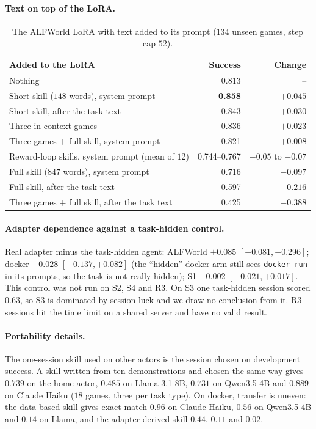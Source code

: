 \documentclass[11pt]{article}
\newcommand{\best}[1]{\textbf{#1}}
\begin{document}
\paragraph{Text on top of the LoRA.}
\begin{table}[h]
\centering
\caption{The ALFWorld LoRA with text added to its prompt ($134$ unseen games, step cap $52$).}
\label{tab:axlora}
\small
\begin{tabular}{lrr}
\toprule
Added to the LoRA & Success & Change\\
\midrule
Nothing & 0.813 & --\\
Short skill ($148$ words), system prompt & \best{0.858} & $+0.045$\\
Short skill, after the task text & 0.843 & $+0.030$\\
Three in-context games & 0.836 & $+0.023$\\
Three games $+$ full skill, system prompt & 0.821 & $+0.008$\\
Reward-loop skills, system prompt (mean of $12$) & 0.744--0.767 & $-0.05$ to $-0.07$\\
Full skill ($847$ words), system prompt & 0.716 & $-0.097$\\
Full skill, after the task text & 0.597 & $-0.216$\\
Three games $+$ full skill, after the task text & 0.425 & $-0.388$\\
\bottomrule
\end{tabular}
\end{table}

\paragraph{Adapter dependence against a task-hidden control.} Real adapter minus the task-hidden agent: ALFWorld $+0.085$ $[-0.081,+0.296]$; docker
$-0.028$ $[-0.137,+0.082]$ (the ``hidden'' docker arm still sees \texttt{docker run} in its prompts, so the task is not really hidden); S1 $-0.002$
$[-0.021,+0.017]$. This control was not run on S2, S4 and R3. On S3 one task-hidden session scored $0.63$, so S3 is dominated by session luck and we
draw no conclusion from it. R3 sessions hit the time limit on a shared server and have no valid result.

\paragraph{Portability details.} The one-session skill used on other actors is the session chosen on development success. A skill written from ten
demonstrations and chosen the same way gives $0.739$ on the home actor, $0.485$ on Llama-3.1-8B, $0.731$ on Qwen3.5-4B and $0.889$ on Claude Haiku ($18$
games, three per task type). On docker, transfer is uneven: the data-based skill gives exact match $0.96$ on Claude Haiku, $0.56$ on Qwen3.5-4B and $0.14$
on Llama, and the adapter-derived skill $0.44$, $0.11$ and $0.02$.
\end{document}
